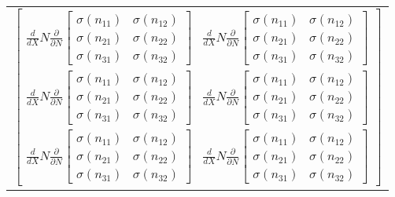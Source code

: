 \documentclass[12pt, border=1cm]{standalone} %
\begin{document}
\begin{tabular}{l}
    $\displaystyle \left[\begin{matrix}\frac{d}{d X} N \frac{\partial}{\partial N} \left[\begin{matrix}\sigma{\left(n_{11} \right)} & \sigma{\left(n_{12} \right)}\\\sigma{\left(n_{21} \right)} & \sigma{\left(n_{22} \right)}\\\sigma{\left(n_{31} \right)} & \sigma{\left(n_{32} \right)}\end{matrix}\right] & \frac{d}{d X} N \frac{\partial}{\partial N} \left[\begin{matrix}\sigma{\left(n_{11} \right)} & \sigma{\left(n_{12} \right)}\\\sigma{\left(n_{21} \right)} & \sigma{\left(n_{22} \right)}\\\sigma{\left(n_{31} \right)} & \sigma{\left(n_{32} \right)}\end{matrix}\right]\\\frac{d}{d X} N \frac{\partial}{\partial N} \left[\begin{matrix}\sigma{\left(n_{11} \right)} & \sigma{\left(n_{12} \right)}\\\sigma{\left(n_{21} \right)} & \sigma{\left(n_{22} \right)}\\\sigma{\left(n_{31} \right)} & \sigma{\left(n_{32} \right)}\end{matrix}\right] & \frac{d}{d X} N \frac{\partial}{\partial N} \left[\begin{matrix}\sigma{\left(n_{11} \right)} & \sigma{\left(n_{12} \right)}\\\sigma{\left(n_{21} \right)} & \sigma{\left(n_{22} \right)}\\\sigma{\left(n_{31} \right)} & \sigma{\left(n_{32} \right)}\end{matrix}\right]\\\frac{d}{d X} N \frac{\partial}{\partial N} \left[\begin{matrix}\sigma{\left(n_{11} \right)} & \sigma{\left(n_{12} \right)}\\\sigma{\left(n_{21} \right)} & \sigma{\left(n_{22} \right)}\\\sigma{\left(n_{31} \right)} & \sigma{\left(n_{32} \right)}\end{matrix}\right] & \frac{d}{d X} N \frac{\partial}{\partial N} \left[\begin{matrix}\sigma{\left(n_{11} \right)} & \sigma{\left(n_{12} \right)}\\\sigma{\left(n_{21} \right)} & \sigma{\left(n_{22} \right)}\\\sigma{\left(n_{31} \right)} & \sigma{\left(n_{32} \right)}\end{matrix}\right]\end{matrix}\right]$


\end{tabular}
\end{document}
